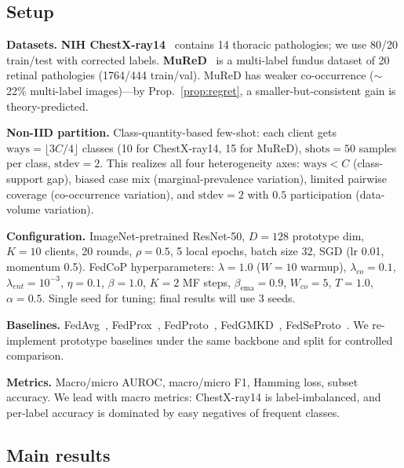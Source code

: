 \documentclass[10pt,twocolumn,letterpaper]{article}
\theoremstyle{definition}
\begin{document}
\subsection{Setup}

\noindent\textbf{Datasets.} \textbf{NIH ChestX-ray14}~\cite{wang2017chestxray8,jaeger2023chestxray} contains 14 thoracic pathologies; we use 80/20 train/test with corrected labels. \textbf{MuReD}~\cite{caro2022mured} is a multi-label fundus dataset of 20 retinal pathologies (1764/444 train/val). MuReD has weaker co-occurrence ($\sim$22\% multi-label images)---by Prop.~\ref{prop:regret}, a smaller-but-consistent gain is theory-predicted.

\noindent\textbf{Non-IID partition.} Class-quantity-based few-shot: each client gets $\text{ways}{=}\lfloor 3C/4\rfloor$ classes (10 for ChestX-ray14, 15 for MuReD), $\text{shots}{=}50$ samples per class, $\text{stdev}{=}2$. This realizes all four heterogeneity axes: $\text{ways}{<}C$ (class-support gap), biased case mix (marginal-prevalence variation), limited pairwise coverage (co-occurrence variation), and $\text{stdev}{=}2$ with $0.5$ participation (data-volume variation).

\noindent\textbf{Configuration.} ImageNet-pretrained ResNet-50, $D{=}128$ prototype dim, $K{=}10$ clients, 20 rounds, $\rho{=}0.5$, 5 local epochs, batch size 32, SGD (lr 0.01, momentum 0.5). FedCoP hyperparameters: $\lambda{=}1.0$ ($W{=}10$ warmup), $\lambda_{co}{=}0.1$, $\lambda_{ent}{=}10^{-3}$, $\eta{=}0.1$, $\beta{=}1.0$, $K{=}2$ MF steps, $\beta_{\text{ema}}{=}0.9$, $W_{co}{=}5$, $T{=}1.0$, $\alpha{=}0.5$. Single seed for tuning; final results will use 3 seeds.

\noindent\textbf{Baselines.} FedAvg~\cite{mcmahan2017fedavg}, FedProx~\cite{li2020fedprox}, FedProto~\cite{tan2022fedproto}, FedGMKD~\cite{zhang2024fedgmkd}, FedSeProto~\cite{fedseproto2024}. We re-implement prototype baselines under the same backbone and split for controlled comparison.

\noindent\textbf{Metrics.} Macro/micro AUROC, macro/micro F1, Hamming loss, subset accuracy. We lead with macro metrics: ChestX-ray14 is label-imbalanced, and per-label accuracy is dominated by easy negatives of frequent classes.

\subsection{Main results}
\end{document}
